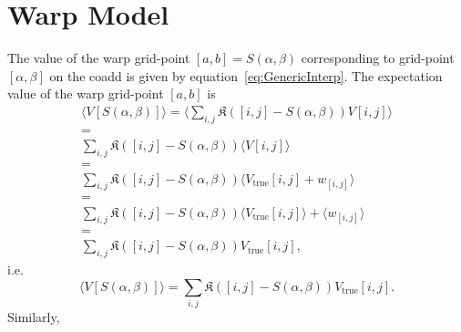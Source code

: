 \documentclass[times]{aastex6}
\begin{document}
\section{Warp Model}
The value of the warp grid-point $[a,b] = S(\alpha,\beta)$ corresponding to grid-point $[\alpha, \beta]$ on the coadd is given by equation~\eqref{eq:GenericInterp}. The expectation value of the warp grid-point $[a,b]$ is
\begin{multline*}
  \langle V[S(\alpha, \beta)] \rangle = \langle \sum_{i,j}\mathfrak{K}([i,j] - S(\alpha,\beta))V[i,j] \rangle \\ = \\ \sum_{i,j}\mathfrak{K}([i,j] - S(\alpha,\beta)) \langle V[i,j] \rangle \\ = \\ \sum_{i,j}\mathfrak{K}([i,j] - S(\alpha,\beta)) \langle V_{\mathrm{true}}[i,j] + w_{[i,j]} \rangle \\ = \\ \sum_{i,j}\mathfrak{K}([i,j] - S(\alpha,\beta)) \langle V_{\mathrm{true}}[i,j] \rangle + \langle w_{[i,j]} \rangle \\ = \\ \sum_{i,j}\mathfrak{K}([i,j] - S(\alpha,\beta))V_{\mathrm{true}}[i,j],
\end{multline*}
i.e.
\begin{equation}\label{eq:WarpMean}
  \langle V[S(\alpha, \beta)] \rangle = \sum_{i,j}\mathfrak{K}([i,j] - S(\alpha,\beta))V_{\mathrm{true}}[i,j].
\end{equation}
Similarly,
\end{document}
